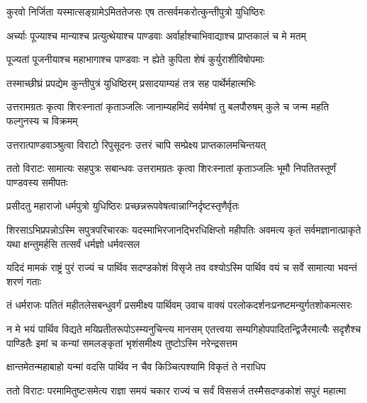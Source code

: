 \twolineshloka
{कुरवो निर्जिता यस्मात्सङ्ग्रामेऽमिततेजसः}
{एष तत्सर्वमकरोत्कुन्तीपुत्रो युधिष्ठिरः}


\twolineshloka
{अर्च्याः पूज्याश्च मान्याश्च प्रत्युत्थेयाश्च पाण्डवाः}
{अर्वार्हाश्चाभिवाद्याश्च प्राप्तकालं च मे मतम्}


\twolineshloka
{पूज्यतां पूजनीयाश्च महाभागाश्च पाण्डवाः}
{न ह्येते कुपिता शेषं कुर्युराशीविषोपमाः}


\twolineshloka
{तस्माच्छीघ्रं प्रपद्येम कुन्तीपुत्रं युधिष्ठिरम्}
{प्रसादयाम्यहं तत्र सह पार्थेर्महात्मभिः}


\threelineshloka
{उत्तरामग्रतः कृत्वा शिरःस्नातां कृताञ्जलिः}
{जानाम्यहमिदं सर्वमेषां तु बलपौरुषम्}
{कुले च जन्म महति फल्गुनस्य च विक्रमम्}




\twolineshloka
{उत्तरात्पाण्डवाञ्श्रुत्वा विराटो रिपुसूदनः}
{उत्तरं चापि सम्प्रेक्ष्य प्राप्तकालमचिन्तयत्}


\threelineshloka
{ततो विराटः सामात्यः सहपुत्रः सबान्धवः}
{उत्तरामग्रतः कृत्वा शिरःस्नातां कृताञ्जलिः}
{भूमौ निपतितस्तूर्णं पाण्डवस्य समीपतः}




\twolineshloka
{प्रसीदतु महाराजो धर्मपुत्रो युधिष्ठिरः}
{प्रच्छन्नरूपवेषत्वान्नाग्निर्दृष्टस्तृणैर्वृतः}


\onelineshloka
{शिरसाऽभिप्रपन्नोऽस्मि सपुत्रपरिचारकः}
\threelineshloka
{यदस्माभिरजानद्भिरधिक्षिप्तो महीपतिः}
{अवमत्य कृतं सर्वमज्ञानात्प्राकृते यथा}
{क्षन्तुमर्हसि तत्सर्वं धर्मज्ञो धर्मवत्सल}


\threelineshloka
{यदिदं मामकं राष्ट्रं पुरं राज्यं च पार्थिव}
{सदण्डकोशं विसृजे तव वश्योऽस्मि पार्थिव}
{वयं च सर्वे सामात्या भवन्तं शरणं गताः}



\twolineshloka
{तं धर्मराजः पतितं महीतलेसबन्धुवर्गं प्रसमीक्ष्य पार्थिवम्}
{उवाच वाक्यं परलोकदर्शनःप्रनष्टमन्युर्गतशोकमत्सरः}


\threelineshloka
{न मे भयं पार्थिव विद्यते मयिप्रतीतरूपोऽस्म्यनुचिन्त्य मानसम्}
{एतत्त्वया सम्यगिहोपपादितन्द्विजैरमात्यैः सदृशैश्च पाण्डितैः}
{इमां च कन्यां समलङ्कृतां भृशंसमीक्ष्य तुष्टोऽस्मि नरेन्द्रसत्तम}


\twolineshloka
{क्षान्तमेतन्महाबाहो यन्मां वदसि पार्थिव}
{न चैव किञ्चित्पश्यामि विकृतं ते नराधिप}



\twolineshloka
{ततो विराटः परमामितुष्टःसमेत्य राज्ञा समयं चकार}
{राज्यं च सर्वं विससर्ज तस्मैसदण्डकोशं सपुरं महात्मा}

